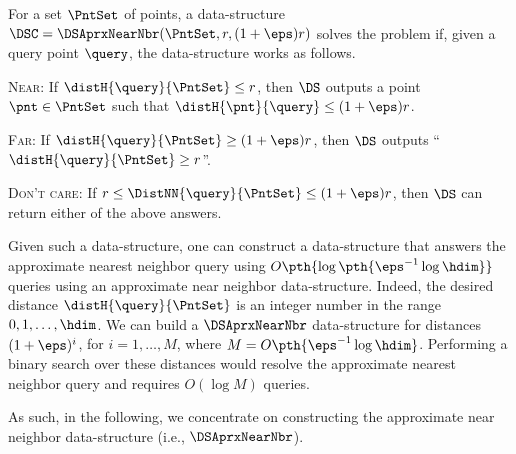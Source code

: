 \begin{defn}
    For a set $\PntSet$ of points, a data-structure
    $\DSC = \DSAprxNearNbr(\PntSet,r,(1+\eps)r)$ solves the
     problem if, given a query point
    $\query$, the data-structure works as follows.
    \begin{compactitem}
        \item \textsc{Near}: If $\distH{\query}{\PntSet} \leq r$, then
        $\DS$ outputs a point $\pnt \in \PntSet$ such that
        $\distH{\pnt}{\query} \leq (1+\eps)r$.
        
        \item \textsc{Far}: If $\distH{\query}{\PntSet} \geq
        (1+\eps) r$, then $\DS$ outputs ``$\distH{\query}{\PntSet}
        \geq r$''.

        \item \textsc{Don't care}: If
        $r \leq \DistNN{\query}{\PntSet} \leq (1+\eps) r$, then $\DS$
        can return either of the above answers.
    \end{compactitem}
\end{defn}

Given such a data-structure, one can construct a data-structure that
answers the approximate nearest neighbor query using $O\pth{ \log\pth{
      \eps^{-1} \log \hdim } }$ queries using an approximate near
neighbor data-structure.  Indeed, the desired distance
$\distH{\query}{\PntSet}$ is an integer number in the range $0,1,
\ldots, \hdim$. We can build a $\DSAprxNearNbr$ data-structure for
distances $(1+\eps)^i$, for $i=1,\ldots, M$, where $M= O\pth{
   \eps^{-1}\log \hdim}$. Performing a binary search over these
distances would resolve the approximate nearest neighbor query and
requires $O( \log M)$ queries.

As such, in the following, we concentrate on constructing the
approximate near neighbor data-structure (i.e., $\DSAprxNearNbr$).







